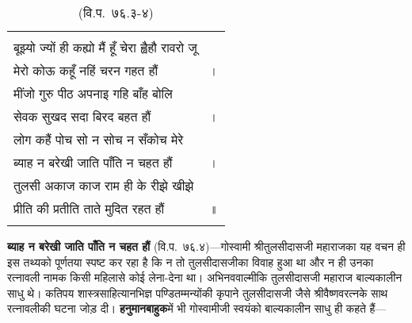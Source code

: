 {\bfseries
\setlength{\mylenone}{0pt}
\settowidth{\mylentwo}{बूझ्यो ज्यों ही कह्यो मैं हूँ चेरा ह्वैहौ रावरो जू}
\setlength{\mylenone}{\maxof{\mylenone}{\mylentwo}}
\settowidth{\mylentwo}{मेरो कोऊ कहूँ नहिं चरन गहत हौं}
\setlength{\mylenone}{\maxof{\mylenone}{\mylentwo}}
\settowidth{\mylentwo}{मींजो गुरु पीठ अपनाइ गहि बाँह बोलि}
\setlength{\mylenone}{\maxof{\mylenone}{\mylentwo}}
\settowidth{\mylentwo}{सेवक सुखद सदा बिरद बहत हौं}
\setlength{\mylenone}{\maxof{\mylenone}{\mylentwo}}
\settowidth{\mylentwo}{लोग कहैं पोच सो न सोच न सँकोच मेरे}
\setlength{\mylenone}{\maxof{\mylenone}{\mylentwo}}
\settowidth{\mylentwo}{ब्याह न बरेखी जाति पाँति न चहत हौं}
\setlength{\mylenone}{\maxof{\mylenone}{\mylentwo}}
\settowidth{\mylentwo}{तुलसी अकाज काज राम ही के रीझे खीझे}
\setlength{\mylenone}{\maxof{\mylenone}{\mylentwo}}
\settowidth{\mylentwo}{प्रीति की प्रतीति ताते मुदित रहत हौं}
\setlength{\mylenone}{\maxof{\mylenone}{\mylentwo}}
\setlength{\mylentwo}{\baselineskip}
\setlength{\mylenone}{\mylenone + 1pt}
\begin{longtable}[l]{@{\hspace*{\mylen}}>{\setlength\parfillskip{0pt}}p{\mylenone}@{}@{}l@{}}
 & \\[-\the\mylentwo]
बूझ्यो ज्यों ही कह्यो मैं हूँ चेरा ह्वैहौ रावरो जू & \\ \nopagebreak
मेरो कोऊ कहूँ नहिं चरन गहत हौं & ।\\
मींजो गुरु पीठ अपनाइ गहि बाँह बोलि & \\ \nopagebreak
सेवक सुखद सदा बिरद बहत हौं & ।\\
लोग कहैं पोच सो न सोच न सँकोच मेरे & \\ \nopagebreak
ब्याह न बरेखी जाति पाँति न चहत हौं & ।\\
तुलसी अकाज काज राम ही के रीझे खीझे & \\ \nopagebreak
प्रीति की प्रतीति ताते मुदित रहत हौं & ॥\\ \nopagebreak
\caption*{(वि.प.~७६.३-४)}
\end{longtable}
}

\begin{sloppypar}\justifying{}
\textbf{ब्याह न बरेखी जाति पाँति न चहत हौं} (वि.प.~७६.४)—गोस्वामी श्रीतुलसीदासजी महाराजका यह वचन ही इस तथ्यको पूर्णतया स्पष्ट कर रहा है कि न तो तुलसीदासजीका विवाह हुआ था और न ही उनका रत्नावली नामक किसी महिलासे कोई लेना-देना था। अभिनव\-वाल्मीकि तुलसीदासजी महाराज बाल्यकालीन साधु थे। कतिपय शास्त्र\-साहित्यानभिज्ञ पण्डितम्मन्योंकी कृपाने तुलसीदासजी जैसे श्रीवैष्णवरत्नके साथ रत्नावलीकी घटना जोड़ दी। \textbf{हनुमानबाहुक}में भी गोस्वामीजी स्वयंको बाल्यकालीन साधु ही कहते हैं—
\end{sloppypar}

